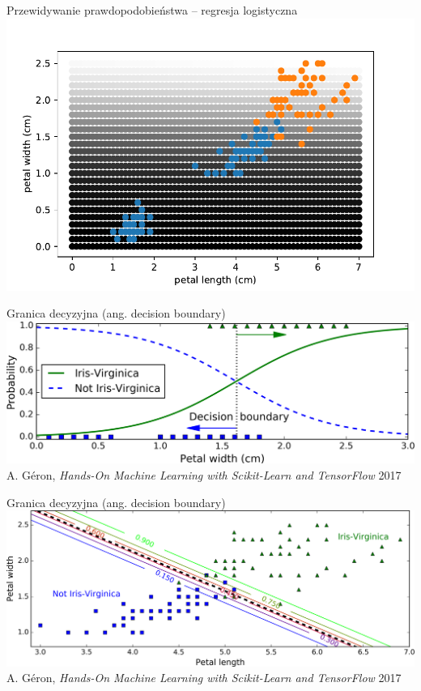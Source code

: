 \documentclass{sa}
\begin{document}
\begin{frame}{Przewidywanie prawdopodobieństwa -- regresja logistyczna}
\includegraphics[width=\textwidth]{iris-simplified-logreg.pdf}
\end{frame}

\begin{frame}{Granica decyzyjna (ang. decision boundary)}
\includegraphics[width=\textwidth]{iris-1attr-decboundary.png}
{\vfill\footnotesize A. Géron, \emph{Hands-On Machine Learning with Scikit-Learn and TensorFlow} 2017}
\end{frame}

\begin{frame}{Granica decyzyjna (ang. decision boundary)}
\includegraphics[width=\textwidth]{iris-2attr-decboundary.png}
{\vfill\footnotesize A. Géron, \emph{Hands-On Machine Learning with Scikit-Learn and TensorFlow} 2017}
\end{frame}
\end{document}
